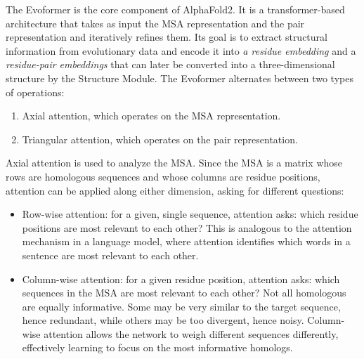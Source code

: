 The Evoformer is the core component of AlphaFold2. It is a transformer-based architecture that takes as input the MSA representation and the pair representation and iteratively refines them. Its goal is to extract structural information from evolutionary data and encode it into \textit{a residue embedding} and  a \textit{residue-pair embeddings} that can later be converted into a three-dimensional structure by the Structure Module.
The Evoformer alternates between two types of operations:
\begin{enumerate}
    \item Axial attention, which operates on the MSA representation.
    \item Triangular attention, which operates on the pair representation.
\end{enumerate}
\vspace{0.8em} \noindent
Axial attention is used to analyze the MSA. Since the MSA is a matrix whose rows are homologous sequences and whose columns are residue positions, attention can be applied along either dimension, asking for different questions:
\begin{itemize}
    \item Row-wise attention: for a given, single sequence, attention asks: which residue positions are most relevant to each other? This is analogous to the attention mechanism in a language model, where attention identifies which words in a sentence are most relevant to each other. 
    \item Column-wise attention: for a given residue position, attention asks: which sequences in the MSA are most relevant to each other? Not all homologous 
    are equally informative. Some may be very similar to the target sequence, hence redundant, while others may be too divergent, hence noisy. Column-wise attention allows the network to weigh different sequences differently, effectively learning to focus on the most informative homologs.
\end{itemize}

